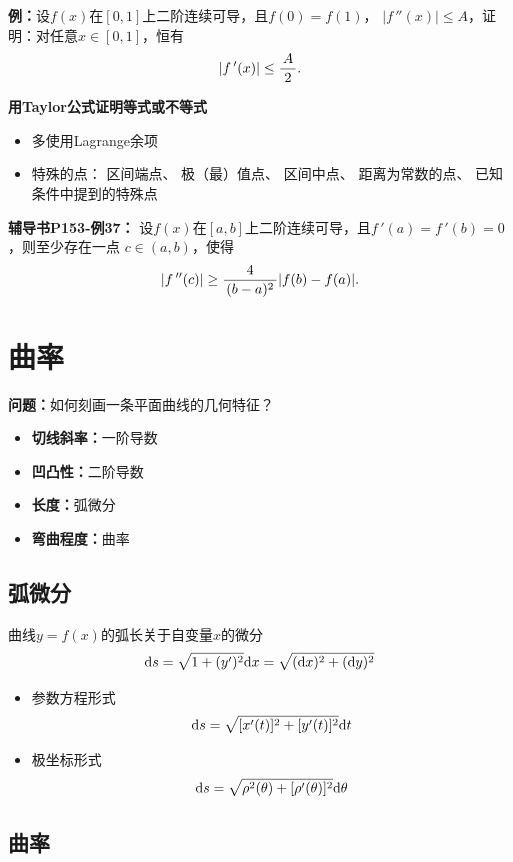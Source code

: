 {\bf 例：}设$f(x)$在$[0,1]$上二阶连续可导，且$f(0)=f(1)$，
$|f\,''(x)|\leq A$，证明：对任意$x\in[0,1]$，恒有
$$|f\,'(x)|\leq\displaystyle\frac{\,{A}\,}{\,{2}\,}.$$

{\b{\bf 用Taylor公式证明等式或不等式} 
\begin{itemize}
  \item 多使用Lagrange余项
  \item 特殊的点： 区间端点、 极（最）值点、
  区间中点、 距离为常数的点、 已知条件中提到的特殊点
\end{itemize}}

{\bf 辅导书P153-例37：}
设$f(x)$在$[a,b]$上二阶连续可导，且$f\,'(a)=f\,'(b)=0$，则至少存在一点
$c\in(a,b)$，使得
$$|f\,''(c)|\geq \displaystyle\frac{\,{4}\,}{\,{(b-a)^2}\,}|f(b)-f(a)|.$$

\section{曲率}

{\bf 问题：}如何刻画一条平面曲线的几何特征？

\begin{itemize}
  \setlength{\itemindent}{1cm}
  \item {\bf 切线斜率：}一阶导数
  \item {\bf 凹凸性：}二阶导数
  \item {\bf 长度：}弧微分
  \item {\bf 弯曲程度：}曲率
\end{itemize}

\subsection{弧微分}

曲线$y=f(x)$的弧长关于自变量$x$的微分 
$$\mathrm{d} s=\sqrt{1+(y')^2}\mathrm{d} x =\sqrt{(\mathrm{d} x)^2+(\mathrm{d} y)^2}$$ 
\begin{itemize}
  \setlength{\itemindent}{1cm}
  \item 参数方程形式 
  $$\mathrm{d} s=\sqrt{[x'(t)]^2+[y'(t)]^2}\mathrm{d} t$$ 
  \vspace{-3ex}
  \item 极坐标形式 
  $$\mathrm{d} s=\sqrt{\rho^2(\theta)+[\rho'(\theta)]^2}\mathrm{d}\theta$$
\end{itemize}

\subsection{曲率}

